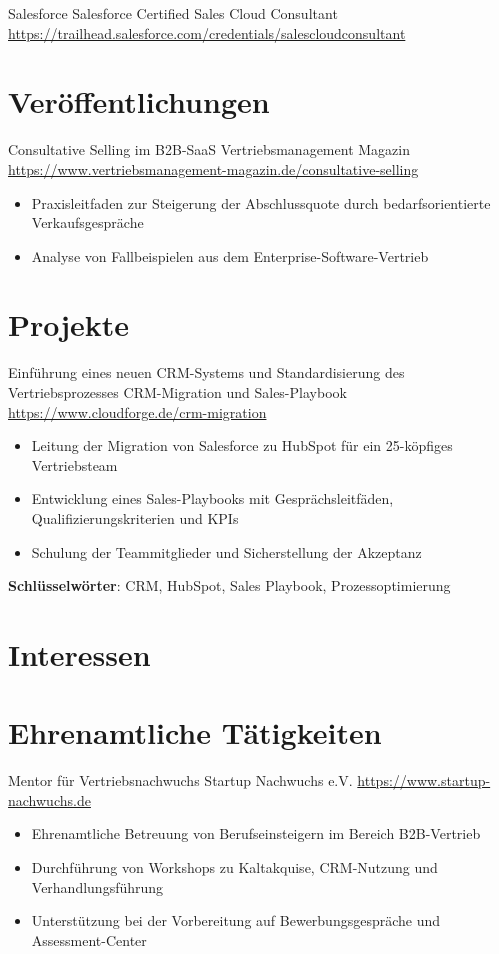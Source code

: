 \documentclass[a4paper, serif, 10pt]{moderncv}
\begin{document}
        {Salesforce}
        {Salesforce Certified Sales Cloud Consultant}
        {\url{https://trailhead.salesforce.com/credentials/salescloudconsultant}}
        {}
        {}
\section{Veröffentlichungen}

        {Consultative Selling im B2B-SaaS}
        {Vertriebsmanagement Magazin}
        {\url{https://www.vertriebsmanagement-magazin.de/consultative-selling}}
        {}
        {\begin{itemize}
\item Praxisleitfaden zur Steigerung der Abschlussquote durch bedarfsorientierte Verkaufsgespräche
\item Analyse von Fallbeispielen aus dem Enterprise-Software-Vertrieb
\end{itemize}}
\section{Projekte}

        {Einführung eines neuen CRM-Systems und Standardisierung des Vertriebsprozesses}
        {CRM-Migration und Sales-Playbook}
        {\url{https://www.cloudforge.de/crm-migration}}
        {}
        {\begin{itemize}
\item Leitung der Migration von Salesforce zu HubSpot für ein 25-köpfiges Vertriebsteam
\item Entwicklung eines Sales-Playbooks mit Gesprächsleitfäden, Qualifizierungskriterien und KPIs
\item Schulung der Teammitglieder und Sicherstellung der Akzeptanz
\end{itemize}
\textbf{Schlüsselwörter}: CRM, HubSpot, Sales Playbook, Prozessoptimierung}
\section{Interessen}

\section{Ehrenamtliche Tätigkeiten}

        {Mentor für Vertriebsnachwuchs}
        {Startup Nachwuchs e.V.}
        {\url{https://www.startup-nachwuchs.de}}
        {}
        {\begin{itemize}
\item Ehrenamtliche Betreuung von Berufseinsteigern im Bereich B2B-Vertrieb
\item Durchführung von Workshops zu Kaltakquise, CRM-Nutzung und Verhandlungsführung
\item Unterstützung bei der Vorbereitung auf Bewerbungsgespräche und Assessment-Center
\end{itemize}}
    
\end{document}
